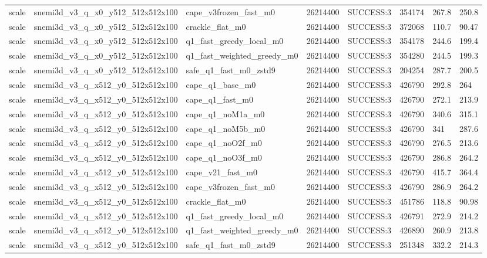 \begin{table}[t]
\begin{tabular}{llllllll}
scale & snemi3d\_v3\_q\_x0\_y512\_512x512x100 & cape\_v3frozen\_fast\_m0 & 26214400 & SUCCESS:3 & 354174 & 267.8 & 250.8 \\
scale & snemi3d\_v3\_q\_x0\_y512\_512x512x100 & crackle\_flat\_m0 & 26214400 & SUCCESS:3 & 372068 & 110.7 & 90.47 \\
scale & snemi3d\_v3\_q\_x0\_y512\_512x512x100 & q1\_fast\_greedy\_local\_m0 & 26214400 & SUCCESS:3 & 354178 & 244.6 & 199.4 \\
scale & snemi3d\_v3\_q\_x0\_y512\_512x512x100 & q1\_fast\_weighted\_greedy\_m0 & 26214400 & SUCCESS:3 & 354280 & 244.5 & 199.3 \\
scale & snemi3d\_v3\_q\_x0\_y512\_512x512x100 & safe\_q1\_fast\_m0\_zstd9 & 26214400 & SUCCESS:3 & 204254 & 287.7 & 200.5 \\
scale & snemi3d\_v3\_q\_x512\_y0\_512x512x100 & cape\_q1\_base\_m0 & 26214400 & SUCCESS:3 & 426790 & 292.8 & 264 \\
scale & snemi3d\_v3\_q\_x512\_y0\_512x512x100 & cape\_q1\_fast\_m0 & 26214400 & SUCCESS:3 & 426790 & 272.1 & 213.9 \\
scale & snemi3d\_v3\_q\_x512\_y0\_512x512x100 & cape\_q1\_noM1a\_m0 & 26214400 & SUCCESS:3 & 426790 & 340.6 & 315.1 \\
scale & snemi3d\_v3\_q\_x512\_y0\_512x512x100 & cape\_q1\_noM5b\_m0 & 26214400 & SUCCESS:3 & 426790 & 341 & 287.6 \\
scale & snemi3d\_v3\_q\_x512\_y0\_512x512x100 & cape\_q1\_noO2f\_m0 & 26214400 & SUCCESS:3 & 426790 & 276.5 & 213.6 \\
scale & snemi3d\_v3\_q\_x512\_y0\_512x512x100 & cape\_q1\_noO3f\_m0 & 26214400 & SUCCESS:3 & 426790 & 286.8 & 264.2 \\
scale & snemi3d\_v3\_q\_x512\_y0\_512x512x100 & cape\_v21\_fast\_m0 & 26214400 & SUCCESS:3 & 426790 & 415.7 & 364.4 \\
scale & snemi3d\_v3\_q\_x512\_y0\_512x512x100 & cape\_v3frozen\_fast\_m0 & 26214400 & SUCCESS:3 & 426790 & 286.9 & 264.2 \\
scale & snemi3d\_v3\_q\_x512\_y0\_512x512x100 & crackle\_flat\_m0 & 26214400 & SUCCESS:3 & 451786 & 118.8 & 90.98 \\
scale & snemi3d\_v3\_q\_x512\_y0\_512x512x100 & q1\_fast\_greedy\_local\_m0 & 26214400 & SUCCESS:3 & 426791 & 272.9 & 214.2 \\
scale & snemi3d\_v3\_q\_x512\_y0\_512x512x100 & q1\_fast\_weighted\_greedy\_m0 & 26214400 & SUCCESS:3 & 426890 & 260.9 & 213.8 \\
scale & snemi3d\_v3\_q\_x512\_y0\_512x512x100 & safe\_q1\_fast\_m0\_zstd9 & 26214400 & SUCCESS:3 & 251348 & 332.2 & 214.3 \\

\end{tabular}
\end{table}

